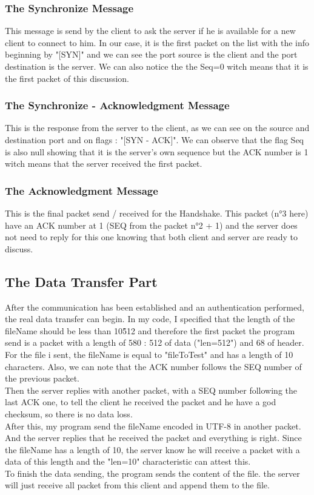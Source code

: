 \documentclass[a4paper]{article}
\begin{document}
\subsubsection{The Synchronize Message}

This message is send by the client to ask the server if he is available for a new client to connect to him.
In our case, it is the first packet on the list with the info beginning by "[SYN]" and we can see the port source is the client and the port destination is the server.
We can also notice the the Seq=0 witch means that it is the first packet of this discussion.

\subsubsection{The Synchronize - Acknowledgment Message}

This is the response from the server to the client, as we can see on the source and destination port and on flags : "[SYN - ACK]".
We can observe that the flag Seq is also null showing that it is the server's own sequence but the ACK number is 1 witch means that the server received the first packet.

\subsubsection{The Acknowledgment Message}

This is the final packet send / received for the Handshake. This packet (n°3 here) have an ACK number at 1 (SEQ from the packet n°2 + 1) and the server does not need to reply for this one knowing that both client and server are ready to discuss.

\subsection{The Data Transfer Part}

After the communication has been established and an authentication performed, the real data transfer can begin.
In my code, I specified that the length of the fileName should be less than 10\^512 and therefore the first packet the program send is a packet with a length of 580 : 512 of data ("len=512") and 68 of header. 
For the file i sent, the fileName is equal to "fileToTest" and has a length of 10 characters.
Also, we can note that the ACK number follows the SEQ number of the previous packet.
\\
Then the server replies with another packet, with a SEQ number following the last ACK one, to tell the client he received the packet and he have a god checksum, so there is no data loss.
\\
After this, my program send the fileName encoded in UTF-8 in another packet. And the server replies that he received the packet and everything is right. Since the fileName has a length of 10, the server know he will receive a packet with a data of this length and the "len=10" characteristic can attest this. 
\\
To finish the data sending, the program sends the content of the file. the server will just receive all packet from this client and append them to the file.
\end{document}
